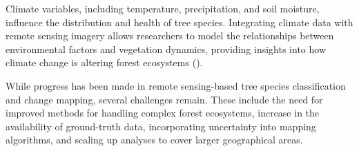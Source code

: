 Climate variables, including temperature, precipitation, and soil moisture, influence the distribution and health of tree species. Integrating climate data with remote sensing imagery allows researchers to model the relationships between environmental factors and vegetation dynamics, providing insights into how climate change is altering forest ecosystems (\cite{pakistan}).

While progress has been made in remote sensing-based tree species classification and change mapping, several challenges remain. These include the need for improved methods for handling complex forest ecosystems, increase in the availability of ground-truth data, incorporating uncertainty into mapping algorithms, and scaling up analyses to cover larger geographical areas.

